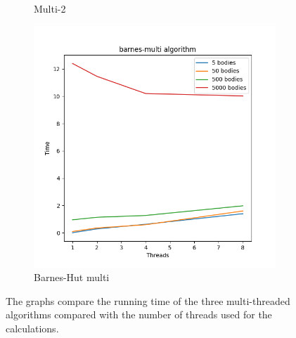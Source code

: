 \documentclass[12pt]{article}
\begin{document}
\begin{figure}[hbt!]
\begin{subfigure}[b]{0.32\textwidth}
        \caption{Multi-2}
        \label{figure:multi-2-algo}
    \end{subfigure}
    \hfill
    \begin{subfigure}[b]{0.32\textwidth}
        \centering
        \includegraphics[width=\textwidth]{simulation/thread_algo_barnes-multi.png}
        \caption{Barnes-Hut multi}
        \label{figure:barnes-hut-algo}
    \end{subfigure}
    \caption[hmm]{The graphs compare the running time of the three multi-threaded algorithms compared with the number of threads used for the calculations.}
    \label{figure:thread_algo}
\end{figure}
\end{document}
